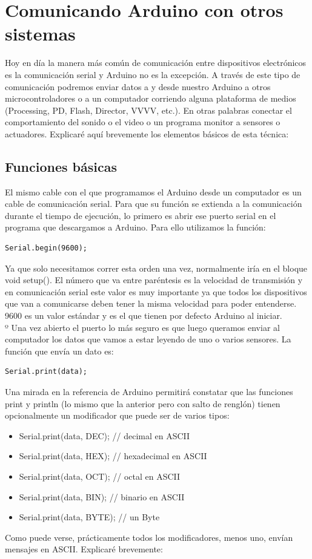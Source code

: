 \chapter{Comunicando Arduino con otros sistemas}

Hoy en día la manera más común de comunicación entre dispositivos electrónicos es la comunicación serial y Arduino no es la excepción. A través de este tipo de comunicación podremos enviar datos a y desde nuestro Arduino a otros microcontroladores o a un computador corriendo alguna plataforma de medios (Processing, PD, Flash, Director, VVVV, etc.). En otras palabras conectar el comportamiento del sonido o el video o un programa monitor a sensores o actuadores. Explicaré aquí brevemente los elementos básicos de esta técnica:
\section{Funciones básicas}
El mismo cable con el que programamos el Arduino desde un computador es un cable de comunicación serial. Para que su función se extienda a la comunicación durante el tiempo de ejecución, lo primero es abrir ese puerto serial en el programa que descargamos a Arduino. Para ello utilizamos la función:
\begin{lstlisting}
Serial.begin(9600);
\end{lstlisting}
Ya que solo necesitamos correr esta orden una vez, normalmente iría en el bloque void setup(). El número que va entre paréntesis es la velocidad de transmisión y en comunicación serial este valor es muy importante ya que todos los dispositivos que van a comunicarse deben tener la misma velocidad para poder entenderse. 9600 es un valor estándar y es el que tienen por defecto Arduino al iniciar.\\º
Una vez abierto el puerto lo más seguro es que luego queramos enviar al computador los datos que vamos a estar leyendo de uno o varios sensores. La función que envía un dato es:
\begin{lstlisting}
Serial.print(data);
\end{lstlisting}
Una mirada en la referencia de Arduino permitirá constatar que las funciones print y println (lo mismo que la anterior pero con salto de renglón) tienen opcionalmente un modificador que puede ser de varios tipos:
\begin{itemize}
\item Serial.print(data, DEC);   // decimal en ASCII
\item Serial.print(data, HEX);   // hexadecimal en ASCII 
\item Serial.print(data, OCT);    // octal en ASCII 
\item Serial.print(data, BIN);    // binario en ASCII 
\item Serial.print(data, BYTE);   // un Byte
\end{itemize}
Como puede verse, prácticamente todos los modificadores, menos uno, envían mensajes en ASCII. Explicaré brevemente:
